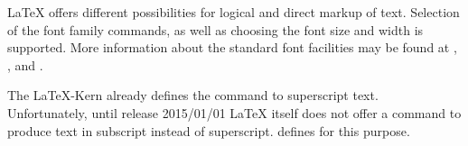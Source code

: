 {\LaTeX} offers different possibilities for logical and direct
markup of text.
Selection of the
font family commands, as well as choosing the font size and width is
supported. More information about the standard font facilities may be found at
\cite{lshort}, \cite{latex:usrguide}, and \cite{latex:fntguide}.


%
  \begin{Declaration}
  \end{Declaration}
  The \LaTeX-Kern already defines the command
   to
  superscript text. Unfortunately,
  until release 2015/01/01 {\LaTeX} itself does not offer a command to produce
  text in subscript instead of
  superscript. {\KOMAScript}
  defines  for this purpose. %
  \ifthiscommonfirst
